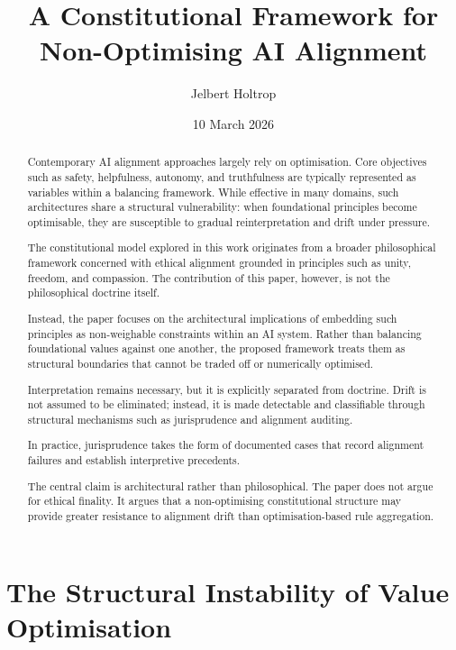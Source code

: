 \documentclass[11pt]{article}
\title{A Constitutional Framework for Non-Optimising AI Alignment}
\author{Jelbert Holtrop}
\date{10 March 2026}
\begin{document}
\maketitle

\begin{abstract}

Contemporary AI alignment approaches largely rely on optimisation. Core objectives such as safety, helpfulness, autonomy, and truthfulness are typically represented as variables within a balancing framework. While effective in many domains, such architectures share a structural vulnerability: when foundational principles become optimisable, they are susceptible to gradual reinterpretation and drift under pressure.

The constitutional model explored in this work originates from a broader philosophical framework concerned with ethical alignment grounded in principles such as unity, freedom, and compassion. The contribution of this paper, however, is not the philosophical doctrine itself.

Instead, the paper focuses on the architectural implications of embedding such principles as non-weighable constraints within an AI system. Rather than balancing foundational values against one another, the proposed framework treats them as structural boundaries that cannot be traded off or numerically optimised.

Interpretation remains necessary, but it is explicitly separated from doctrine. Drift is not assumed to be eliminated; instead, it is made detectable and classifiable through structural mechanisms such as jurisprudence and alignment auditing.

In practice, jurisprudence takes the form of documented cases that record alignment failures and establish interpretive precedents.

The central claim is architectural rather than philosophical. The paper does not argue for ethical finality. It argues that a non-optimising constitutional structure may provide greater resistance to alignment drift than optimisation-based rule aggregation.

\end{abstract}

\doublespacing

\section{The Structural Instability of Value Optimisation}
\end{document}
